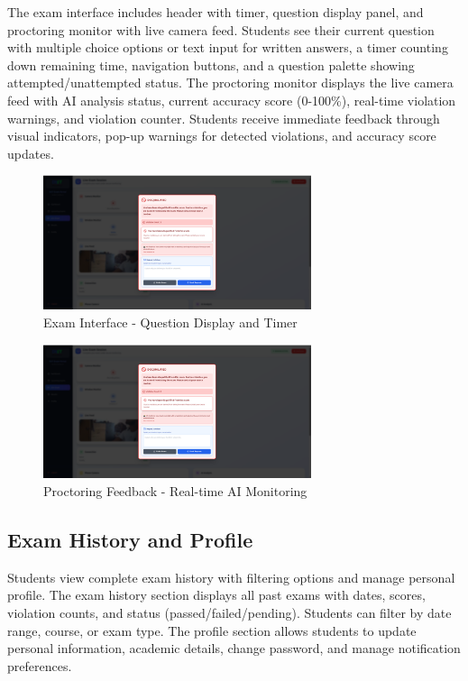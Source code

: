 The exam interface includes header with timer, question display panel, and proctoring monitor with live camera feed. Students see their current question with multiple choice options or text input for written answers, a timer counting down remaining time, navigation buttons, and a question palette showing attempted/unattempted status. The proctoring monitor displays the live camera feed with AI analysis status, current accuracy score (0-100\%), real-time violation warnings, and violation counter. Students receive immediate feedback through visual indicators, pop-up warnings for detected violations, and accuracy score updates.

\begin{figure}[p]
    \centering
    \includegraphics[width=0.7\textwidth]{Chap4/student_exam_interface.png}
    \caption{Exam Interface - Question Display and Timer}
    \label{fig:student_exam}
\end{figure}

\begin{figure}[p]
    \centering
    \includegraphics[width=0.7\textwidth]{Chap4/student_proctoring_feedback.png}
    \caption{Proctoring Feedback - Real-time AI Monitoring}
    \label{fig:student_feedback}
\end{figure}

\subsection{Exam History and Profile}

Students view complete exam history with filtering options and manage personal profile. The exam history section displays all past exams with dates, scores, violation counts, and status (passed/failed/pending). Students can filter by date range, course, or exam type. The profile section allows students to update personal information, academic details, change password, and manage notification preferences.


